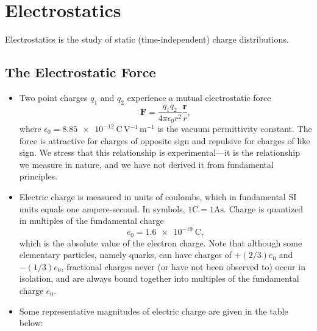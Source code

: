 \documentclass[11pt, a4paper]{article}
\renewcommand{\vec}[1]{\bm{#1}} %
\renewcommand{\r}{\vec{r}}
\newcommand{\ee}{\epsilon_{0}}  %
\begin{document}
\newpage
\tableofcontents
\newpage


\pagestyle{headerstyle}
\section{Electrostatics}
Electrostatics is the study of static (time-independent) charge distributions.

\subsection{The Electrostatic Force}
\begin{itemize}
    \item Two point charges $ q_{1} $ and $ q_{2} $ experience a mutual electrostatic force
    \begin{equation*}
        \vec{F} = \frac{q_{1}q_{2}}{4\pi \ee r^{2}} \frac{\r}{r},
    \end{equation*}
    where $ \ee = \SI{8.85e-12}{\coulomb \, \volt^{-1}\, \meter^{-1}} $ is the vacuum permittivity constant. The force is attractive for charges of opposite sign and repulsive for charges of like sign. We stress that this relationship is experimental---it is the relationship we measure in nature, and we have not derived it from fundamental principles. 

    \item Electric charge is measured in units of coulombs, which in fundamental SI units equals one ampere-second. In symbols, $ 1\si{\coulomb} = 1\si{\ampere \second} $. Charge is quantized in multiples of the fundamental charge
    \begin{equation*}
        e_{0} = \SI{1.6e-19}{\coulomb},
    \end{equation*}
    which is the absolute value of the electron charge. Note that although some elementary particles, namely quarks, can have charges of $ +(2/3)e_{0} $ and $ -(1/3)e_{0} $, fractional charges never (or have not been observed to) occur in isolation, and are always bound together into multiples of the fundamental charge $ e_{0} $.

    \item Some representative magnitudes of electric charge are given in the table below:


\end{itemize}
\end{document}
